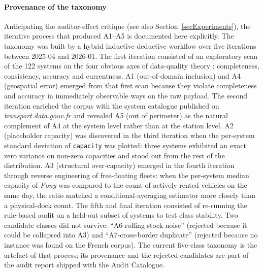 \documentclass[a4paper,twoside]{article}
\begin{document}
\paragraph{Provenance of the taxonomy}
Anticipating the auditor-effect critique (see also
Section~\ref{secExperiments}), the iterative process that produced
A1--A5 is documented here explicitly. The taxonomy was built by a
hybrid inductive-deductive workflow over five iterations between
2025-04 and 2026-01. The first iteration consisted of an
exploratory scan of the 122 systems on the four obvious axes of
data-quality theory \cite{ISO25012}: completeness, consistency,
accuracy and currentness. A1 (out-of-domain inclusion) and A4
(geospatial error) emerged from that first scan because they
violate completeness and accuracy in immediately observable ways
on the raw payload. The second iteration enriched the corpus with
the system catalogue published on \emph{transport.data.gouv.fr}
and revealed A5 (out of perimeter) as the natural complement of
A4 at the system level rather than at the station level. A2
(placeholder capacity) was discovered in the third iteration when
the per-system standard deviation of \texttt{capacity} was
plotted: three systems exhibited an exact zero variance on
non-zero capacities and stood out from the rest of the
distribution. A3 (structural over-capacity) emerged in the fourth
iteration through reverse engineering of free-floating fleets:
when the per-system median capacity of \emph{Pony} was compared
to the count of actively-rented vehicles on the same day, the
ratio matched a conditional-averaging estimator more closely than
a physical-dock count. The fifth and final iteration consisted of
re-running the rule-based audit on a held-out subset of systems
to test class stability. Two candidate classes did not survive:
``A6-rolling stock noise'' (rejected because it could be
collapsed into A3) and ``A7-cross-border duplicate''
(rejected because no instance was found on the French corpus).
The current five-class taxonomy is the artefact of that process;
its provenance and the rejected candidates are part of the audit
report shipped with the Audit Catalogue.
\end{document}
